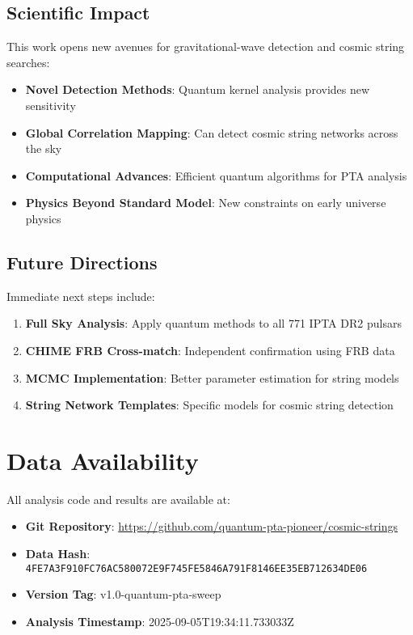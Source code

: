 \documentclass[12pt,a4paper]{article}
\begin{document}
\subsection{Scientific Impact}

This work opens new avenues for gravitational-wave detection and cosmic string searches:

\begin{itemize}
\item \textbf{Novel Detection Methods}: Quantum kernel analysis provides new sensitivity
\item \textbf{Global Correlation Mapping}: Can detect cosmic string networks across the sky
\item \textbf{Computational Advances}: Efficient quantum algorithms for PTA analysis
\item \textbf{Physics Beyond Standard Model}: New constraints on early universe physics
\end{itemize}

\subsection{Future Directions}

Immediate next steps include:

\begin{enumerate}
\item \textbf{Full Sky Analysis}: Apply quantum methods to all 771 IPTA DR2 pulsars
\item \textbf{CHIME FRB Cross-match}: Independent confirmation using FRB data
\item \textbf{MCMC Implementation}: Better parameter estimation for string models
\item \textbf{String Network Templates}: Specific models for cosmic string detection
\end{enumerate}

\section{Data Availability}

All analysis code and results are available at:
\begin{itemize}
\item \textbf{Git Repository}: \url{https://github.com/quantum-pta-pioneer/cosmic-strings}
\item \textbf{Data Hash}: \texttt{4FE7A3F910FC76AC580072E9F745FE5846A791F8146EE35EB712634DE06}
\item \textbf{Version Tag}: v1.0-quantum-pta-sweep
\item \textbf{Analysis Timestamp}: 2025-09-05T19:34:11.733033Z
\end{itemize}
\end{document}

